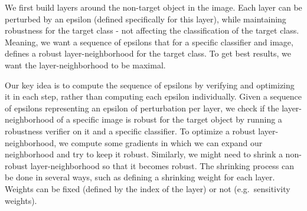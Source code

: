 
We first build layers around the non-target object in the image.
Each layer can be perturbed by an epsilon (defined specifically for this layer), while maintaining robustness for the target class - not affecting the classification of the target class.
Meaning, we want a sequence of epsilons that for a specific classifier and image, defines a robust layer-neighborhood for the target class.
To get best results, we want the layer-neighborhood to be maximal.

Our key idea is to compute the sequence of epsilons by verifying and optimizing it in each step, rather than computing each epsilon individually.
Given a sequence of epsilons representing an epsilon of perturbation per layer, we check if the layer-neighborhood of a specific image is robust for the target object by running a robustness verifier on it and a specific classifier.
To optimize a robust layer-neighborhood, we compute some gradients in which we can expand our neighborhood and try to keep it robust.
Similarly, we might need to shrink a non-robust layer-neighborhood so that it becomes robust.
The shrinking process can be done in several ways, such as defining a shrinking weight for each layer.
Weights can be fixed (defined by the index of the layer) or not (e.g.\ sensitivity weights).
